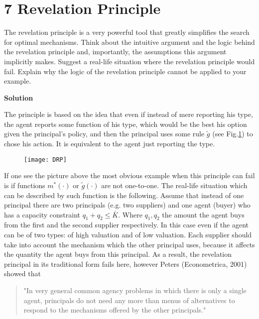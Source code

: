 \documentclass[a4paper]{article}
\begin{document}
		\section*{7 Revelation Principle}
			The revelation principle is a very powerful tool that greatly simplifies the search for optimal
			mechanisms. Think about the intuitive argument and the logic behind the revelation principle
			and, importantly, the assumptions this argument implicitly makes. Suggest a real-life situation
			where the revelation principle would fail. Explain why the logic of the revelation principle
			cannot be applied to your example.
			
			
			\textbf{Solution}
			
			The principle is based on the idea that even if instead of mere reporting his type, the agent reports some function of his type, which would be the best his option given the principal's policy, and then the principal uses some rule $\tilde{g}$ (see Fig.\ref{fig2}) to chose his action. It is equivalent to the agent just reporting the type. 
			\begin{figure}[H]
				\centering
				\texttt{[image: DRP]}
				\caption{}\label{fig2}
			\end{figure}
			If one see the picture above the most obvious example when this principle can fail is if functions $m^*(\cdot)$ or $\tilde{g}(\cdot)$ are not one-to-one. The real-life situation which can be described by such function is the following. Assume that instead of one principal there are two principals (e.g. two suppliers) and one agent (buyer) who has a capacity constraint $q_1 + q_2 \le \bar{K}$. Where $q_1, q_2$ the amount the agent buys from the first and the second supplier respectively. In this case even if the agent can be of two types: of high valuation and of low valuation. Each supplier should take into account the mechanism which the other principal uses, because it affects the quantity the agent buys from this principal. As a result, the revelation principal in its traditional form fails here, however Peters (Econometrica, 2001) showed that 
			\begin{quote}
				"In very general
				common agency problems in which there is only a single agent, principals do not need
				any more than menus of alternatives to respond to the mechanisms offered by the other
				principals."
			\end{quote}
\end{document}
